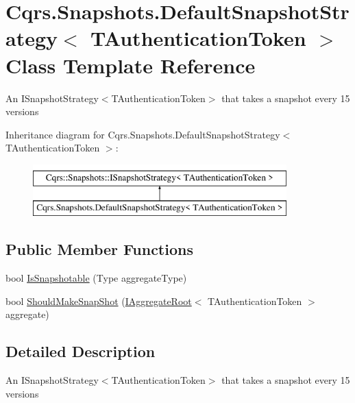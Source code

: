 \hypertarget{classCqrs_1_1Snapshots_1_1DefaultSnapshotStrategy}{}\section{Cqrs.\+Snapshots.\+Default\+Snapshot\+Strategy$<$ T\+Authentication\+Token $>$ Class Template Reference}
\label{classCqrs_1_1Snapshots_1_1DefaultSnapshotStrategy}


An I\+Snapshot\+Strategy$<$\+T\+Authentication\+Token$>$ that takes a snapshot every 15 versions  


Inheritance diagram for Cqrs.\+Snapshots.\+Default\+Snapshot\+Strategy$<$ T\+Authentication\+Token $>$\+:\begin{figure}[H]
\begin{center}
\leavevmode
\includegraphics[height=2.000000cm]{classCqrs_1_1Snapshots_1_1DefaultSnapshotStrategy}
\end{center}
\end{figure}
\subsection*{Public Member Functions}
\begin{DoxyCompactItemize}
\item 
bool \hyperlink{classCqrs_1_1Snapshots_1_1DefaultSnapshotStrategy_aea1e973d654aaee6f620543be7343fda_aea1e973d654aaee6f620543be7343fda}{Is\+Snapshotable} (Type aggregate\+Type)
\item 
bool \hyperlink{classCqrs_1_1Snapshots_1_1DefaultSnapshotStrategy_a59ee11e5c488a40933685e232661df39_a59ee11e5c488a40933685e232661df39}{Should\+Make\+Snap\+Shot} (\hyperlink{interfaceCqrs_1_1Domain_1_1IAggregateRoot}{I\+Aggregate\+Root}$<$ T\+Authentication\+Token $>$ aggregate)
\end{DoxyCompactItemize}


\subsection{Detailed Description}
An I\+Snapshot\+Strategy$<$\+T\+Authentication\+Token$>$ that takes a snapshot every 15 versions 


